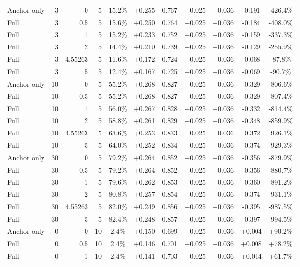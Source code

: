 \begin{table}[htbp]
\begin{tabular}{lrrrccccccc}
Anchor only & 3 & 0 & 5 & 15.2\% & +0.255 & 0.767 & +0.025 & +0.036 & -0.191 & -426.4\% \\
Full & 3 & 0.5 & 5 & 15.6\% & +0.250 & 0.764 & +0.025 & +0.036 & -0.184 & -408.0\% \\
Full & 3 & 1 & 5 & 15.2\% & +0.233 & 0.752 & +0.025 & +0.036 & -0.159 & -337.3\% \\
Full & 3 & 2 & 5 & 14.4\% & +0.210 & 0.739 & +0.025 & +0.036 & -0.129 & -255.9\% \\
Full & 3 & 4.55263 & 5 & 11.6\% & +0.172 & 0.724 & +0.025 & +0.036 & -0.068 & -87.8\% \\
Full & 3 & 5 & 5 & 12.4\% & +0.167 & 0.725 & +0.025 & +0.036 & -0.069 & -90.7\% \\
Anchor only & 10 & 0 & 5 & 55.2\% & +0.268 & 0.827 & +0.025 & +0.036 & -0.329 & -806.6\% \\
Full & 10 & 0.5 & 5 & 55.2\% & +0.268 & 0.827 & +0.025 & +0.036 & -0.329 & -807.4\% \\
Full & 10 & 1 & 5 & 56.0\% & +0.267 & 0.828 & +0.025 & +0.036 & -0.332 & -814.4\% \\
Full & 10 & 2 & 5 & 58.8\% & +0.261 & 0.829 & +0.025 & +0.036 & -0.348 & -859.9\% \\
Full & 10 & 4.55263 & 5 & 63.6\% & +0.253 & 0.833 & +0.025 & +0.036 & -0.372 & -926.1\% \\
Full & 10 & 5 & 5 & 64.0\% & +0.252 & 0.834 & +0.025 & +0.036 & -0.374 & -929.3\% \\
Anchor only & 30 & 0 & 5 & 79.2\% & +0.264 & 0.852 & +0.025 & +0.036 & -0.356 & -879.9\% \\
Full & 30 & 0.5 & 5 & 79.2\% & +0.264 & 0.852 & +0.025 & +0.036 & -0.356 & -880.7\% \\
Full & 30 & 1 & 5 & 79.6\% & +0.262 & 0.853 & +0.025 & +0.036 & -0.360 & -891.2\% \\
Full & 30 & 2 & 5 & 80.8\% & +0.257 & 0.854 & +0.025 & +0.036 & -0.374 & -931.1\% \\
Full & 30 & 4.55263 & 5 & 82.0\% & +0.249 & 0.856 & +0.025 & +0.036 & -0.395 & -987.5\% \\
Full & 30 & 5 & 5 & 82.4\% & +0.248 & 0.857 & +0.025 & +0.036 & -0.397 & -994.5\% \\
Anchor only & 0 & 0 & 10 & 2.4\% & +0.150 & 0.699 & +0.025 & +0.036 & +0.004 & +90.2\% \\
Full & 0 & 0.5 & 10 & 2.4\% & +0.146 & 0.701 & +0.025 & +0.036 & +0.008 & +78.2\% \\
Full & 0 & 1 & 10 & 2.4\% & +0.141 & 0.703 & +0.025 & +0.036 & +0.014 & +61.7\% \\

\end{tabular}
\end{table}
